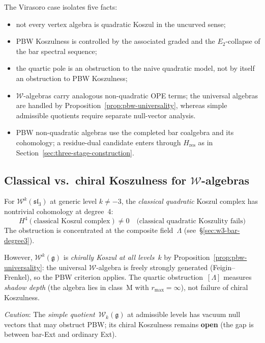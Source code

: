 \begin{remark}
The Virasoro case isolates five facts:
\begin{itemize}
\item not every vertex algebra is quadratic Koszul in the uncurved
sense;
\item PBW Koszulness is controlled by the associated graded and the
$E_2$-collapse of the bar spectral sequence;
\item the quartic pole is an obstruction to the naive quadratic model,
not by itself an obstruction to PBW Koszulness;
\item $\mathcal W$-algebras carry analogous non-quadratic OPE terms;
the universal algebras are handled by Proposition~\ref{prop:pbw-universality},
whereas simple admissible quotients require separate null-vector
analysis.
\item PBW non-quadratic algebras use the completed bar coalgebra and
its cohomology; a residue-dual candidate enters through
$H_{\mathrm{res}}$ as in
Section~\ref{sec:three-stage-construction}.
\end{itemize}
\end{remark}

\subsection{Classical vs.\ chiral Koszulness for $\mathcal{W}$-algebras}

\begin{remark}
\label{rem:w-algebra-classical-vs-chiral-koszul}
For $\mathcal{W}^k(\mathfrak{sl}_3)$ at generic level $k \neq -3$,
the \emph{classical quadratic} Koszul complex has nontrivial cohomology
at degree~4:
\begin{equation}
H^4(\text{classical Koszul complex}) \neq 0 \quad \text{(classical quadratic Koszulity fails)}
\end{equation}
The obstruction is concentrated at the composite field~$\Lambda$
(see~\S\ref{sec:w3-bar-degree3}).

However, $\mathcal{W}^k(\mathfrak{g})$ is \emph{chirally Koszul at all
levels}~$k$ by Proposition~\ref{prop:pbw-universality}: the universal
$\mathcal{W}$-algebra is freely strongly generated (Feigin--Frenkel),
so the PBW criterion applies. The quartic obstruction~$[\Lambda]$
measures \emph{shadow depth} (the algebra lies in class~M with
$r_{\max}=\infty$), not failure of chiral Koszulness.

\emph{Caution}: The \emph{simple quotient}~$\mathcal{W}_k(\mathfrak{g})$
at admissible levels has vacuum null vectors that may obstruct PBW; its
chiral Koszulness remains \textbf{open} (the gap is between bar-Ext and
ordinary Ext).
\end{remark}

